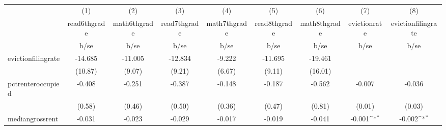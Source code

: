 {
\def\sym#1{\ifmmode^{#1}\else\(^{#1}\)\fi}
\begin{tabular}{l*{8}{c}}
\hline\hline
            &\multicolumn{1}{c}{(1)}           &\multicolumn{1}{c}{(2)}           &\multicolumn{1}{c}{(3)}           &\multicolumn{1}{c}{(4)}           &\multicolumn{1}{c}{(5)}           &\multicolumn{1}{c}{(6)}           &\multicolumn{1}{c}{(7)}           &\multicolumn{1}{c}{(8)}           \\
            &\multicolumn{1}{c}{read6thgrade}  &\multicolumn{1}{c}{math6thgrade}  &\multicolumn{1}{c}{read7thgrade}  &\multicolumn{1}{c}{math7thgrade}  &\multicolumn{1}{c}{read8thgrade}  &\multicolumn{1}{c}{math8thgrade}  &\multicolumn{1}{c}{evictionrate}  &\multicolumn{1}{c}{evictionfilingrate}\\
            &                     b/se         &                     b/se         &                     b/se         &                     b/se         &                     b/se         &                     b/se         &                     b/se         &                     b/se         \\
\hline
evictionfilingrate&                  -14.685         &                  -11.005         &                  -12.834         &                   -9.222         &                  -11.695         &                  -19.461         &                                  &                                  \\
            &                  (10.87)         &                   (9.07)         &                   (9.21)         &                   (6.67)         &                   (9.11)         &                  (16.01)         &                                  &                                  \\
pctrenteroccupied&                   -0.408         &                   -0.251         &                   -0.387         &                   -0.148         &                   -0.187         &                   -0.562         &                   -0.007         &                   -0.036         \\
            &                   (0.58)         &                   (0.46)         &                   (0.50)         &                   (0.36)         &                   (0.47)         &                   (0.81)         &                   (0.01)         &                   (0.03)         \\
mediangrossrent&                   -0.031         &                   -0.023         &                   -0.029         &                   -0.017         &                   -0.019         &                   -0.041         &                   -0.001\sym{*}  &                   -0.002\sym{*}  \\

\end{tabular}}
